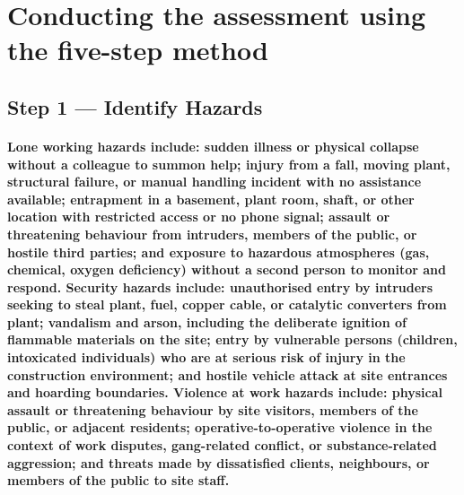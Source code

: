 \begin{itemize}
\end{itemize}

\section{Conducting the assessment using the five-step method}

\subsection{Step 1 --- Identify Hazards}
\paragraph{Lone working hazards include: sudden illness or physical collapse without a colleague to summon help; injury from a fall, moving plant, structural failure, or manual handling incident with no assistance available; entrapment in a basement, plant room, shaft, or other location with restricted access or no phone signal; assault or threatening behaviour from intruders, members of the public, or hostile third parties; and exposure to hazardous atmospheres (gas, chemical, oxygen deficiency) without a second person to monitor and respond. Security hazards include: unauthorised entry by intruders seeking to steal plant, fuel, copper cable, or catalytic converters from plant; vandalism and arson, including the deliberate ignition of flammable materials on the site; entry by vulnerable persons (children, intoxicated individuals) who are at serious risk of injury in the construction environment; and hostile vehicle attack at site entrances and hoarding boundaries. Violence at work hazards include: physical assault or threatening behaviour by site visitors, members of the public, or adjacent residents; operative-to-operative violence in the context of work disputes, gang-related conflict, or substance-related aggression; and threats made by dissatisfied clients, neighbours, or members of the public to site staff.}

